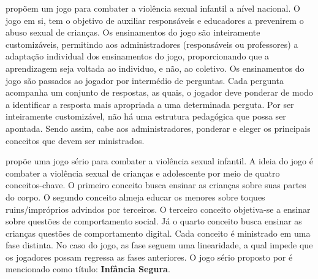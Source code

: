
 propõem um jogo para combater a violência sexual infantil a nível nacional. O jogo em si, tem o objetivo de auxiliar responsáveis e educadores a prevenirem o abuso sexual de crianças. Os ensinamentos do jogo são inteiramente customizáveis, permitindo aos administradores (responsáveis ou professores) a adaptação individual dos ensinamentos do jogo, proporcionando que a aprendizagem seja voltada ao individuo, e não, ao coletivo. Os ensinamentos do jogo são passados ao jogador por intermédio de perguntas. Cada pergunta acompanha um conjunto de respostas, as quais, o jogador deve ponderar de modo a identificar a resposta mais apropriada a uma determinada perguta. %
Por ser inteiramente customizável, não há uma estrutura pedagógica que possa ser apontada. Sendo assim, cabe aos administradores, ponderar e eleger os principais conceitos que devem ser ministrados.


 propõe uma jogo sério para combater a violência sexual infantil. A ideia do jogo é combater a violência sexual de crianças e adolescente por meio de quatro conceitos-chave. O primeiro conceito busca ensinar as crianças sobre suas partes do corpo. O segundo conceito almeja educar os menores sobre toques ruins/impróprios advindos por terceiros. O terceiro conceito objetiva-se a ensinar sobre questões de comportamento social. Já o quarto conceito busca ensinar as crianças questões de comportamento digital. Cada conceito é ministrado em uma fase distinta. No caso do jogo, as fase seguem uma linearidade, a qual impede que os jogadores possam regressa as fases anteriores. O jogo sério proposto por  é mencionado como título: \textbf{Infância Segura}.

